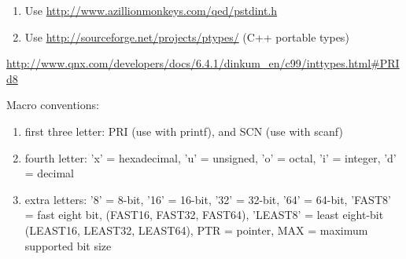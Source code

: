 \begin{enumerate}
We need to replace the left with the right
\begin{verbatim}
 DON'T USE               USE
short                 int16_t
unsigned short        uint16_t
int                   int32_t
unsigned int          uint32_t
long                  int32_t or int64_t
unsigned long         uint32_t or unint64_t
long long             int64_t
unsigned long long    uint64_t
\end{verbatim}

\url{http://stackoverflow.com/questions/7597025/difference-between-stdint-h-and-inttypes-h}

Example: instead of using \verb!%ld! or \verb!%lld! we use PRIx8 to indicate 
8-bit, and PRId32 to indicate 32-bit.
\begin{Verbatim}
#include <inttypes.h>

uint8_t smallval;
int32_t longval;
...
printf("The hexadecimal value of smallval is %" PRIx8
       ", the decimal value of longval is %" PRId32 ".\n",
       smallval, longval);

    // Only requires stdint.h to compile:
    uint16_t myvar = 65535;

    // Requires inttypes.h to compile:
    printf("myvar=%" PRIu16 "\n", myvar);  
\end{Verbatim}


\begin{verbatim}
                 printf         scanf
int8_t          PRId8          SCNd8
uint8_t         PRIu8          SCNu8

int16_t         PRId16         SCNd16
uint16_t        PRIu16         SCNu16

int32_t         PRId32         SCNd32
uint32_t        PRIu32         SCNu32

int64_t         PRId64         SCNd64
uint64_t        PRIu64         SCNu64

\end{verbatim}

  \item Use \url{http://www.azillionmonkeys.com/qed/pstdint.h}
  
  \item Use \url{http://sourceforge.net/projects/ptypes/} (C++ portable types)
\end{enumerate}
\url{http://www.qnx.com/developers/docs/6.4.1/dinkum_en/c99/inttypes.html#PRId8}

Macro conventions: 
\begin{enumerate}
  \item first three letter: PRI (use with printf), and SCN (use with scanf)
  \item fourth letter: 'x' = hexadecimal, 'u' = unsigned, 'o' = octal, 'i' =
  integer, 'd' = decimal
  \item extra letters: '8' = 8-bit, '16' = 16-bit, '32' = 32-bit, '64' = 64-bit,
  'FAST8' = fast eight bit, (FAST16, FAST32, FAST64), 'LEAST8' = least eight-bit
  (LEAST16, LEAST32, LEAST64), PTR = pointer, MAX = maximum supported bit size
\end{enumerate}

